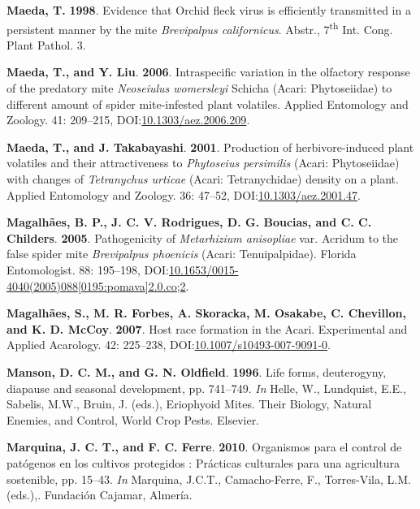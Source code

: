 \documentclass[12pt,final,CPage]{ufthesis}
\newlength{\cslhangindent}
\newenvironment{CSLReferences}[2] %
{%
	\setlength{\parindent}{0pt}
	\ifodd #1 \everypar{\setlength{\hangindent}{\cslhangindent}}\ignorespaces\fi
	\ifnum #2 > 0
	\setlength{\parskip}{#2\baselineskip}
	\fi
}%
{}
\begin{document}
{\begin{CSLReferences}{1}{0}
  \leavevmode{}%
  \textbf{Maeda, T.} \textbf{1998}. Evidence that {Orchid fleck virus} is efficiently transmitted in a persistent manner by the mite {\emph{Brevipalpus californicus}}. Abstr., 7\textsuperscript{th} Int. Cong. Plant Pathol. 3.

  \leavevmode{}%
  \textbf{Maeda, T., and Y. Liu}. \textbf{2006}. Intraspecific variation in the olfactory response of the predatory mite {\emph{Neoseiulus womersleyi}} {Schicha} {({Acari}: {Phytoseiidae})} to different amount of spider mite-infested plant volatiles. Applied Entomology and Zoology. 41: 209--215, DOI:\href{https://doi.org/10.1303/aez.2006.209}{10.1303/aez.2006.209}.

  \leavevmode{}%
  \textbf{Maeda, T., and J. Takabayashi}. \textbf{2001}. Production of herbivore-induced plant volatiles and their attractiveness to {\emph{Phytoseius persimilis}} {({Acari}: {Phytoseiidae})} with changes of {\emph{Tetranychus urticae}} {({Acari}: Tetranychidae)} density on a plant. Applied Entomology and Zoology. 36: 47--52, DOI:\href{https://doi.org/10.1303/aez.2001.47}{10.1303/aez.2001.47}.

  \leavevmode{}%
  \textbf{Magalhães, B. P., J. C. V. Rodrigues, D. G. Boucias, and C. C. Childers}. \textbf{2005}. Pathogenicity of {\emph{Metarhizium anisopliae}} var. Acridum to the false spider mite {\emph{Brevipalpus phoenicis}} ({Acari}: {Tenuipalpidae}). Florida Entomologist. 88: 195--198, DOI:\href{https://doi.org/10.1653/0015-4040(2005)088\%5B0195:pomava\%5D2.0.co;2}{10.1653/0015-4040(2005)088{[}0195:pomava{]}2.0.co;2}.

  \leavevmode{}%
  \textbf{Magalhães, S., M. R. Forbes, A. Skoracka, M. Osakabe, C. Chevillon, and K. D. McCoy}. \textbf{2007}. Host race formation in the {Acari}. Experimental and Applied Acarology. 42: 225--238, DOI:\href{https://doi.org/10.1007/s10493-007-9091-0}{10.1007/s10493-007-9091-0}.

  \leavevmode{}%
  \textbf{Manson, D. C. M., and G. N. Oldfield}. \textbf{1996}. Life forms, deuterogyny, diapause and seasonal development, pp. 741--749. \emph{In} Helle, W., Lundquist, E.E., Sabelis, M.W., Bruin, J. (eds.), Eriophyoid Mites. Their Biology, Natural Enemies, and Control, World Crop Pests. Elsevier.

  \leavevmode{}%
  \textbf{Marquina, J. C. T., and F. C. Ferre}. \textbf{2010}. Organismos para el control de pat{ó}genos en los cultivos protegidos : Pr{á}cticas culturales para una agricultura sostenible, pp. 15--43. \emph{In} Marquina, J.C.T., Camacho-Ferre, F., Torres-Vila, L.M. (eds.),. Fundaci{ó}n Cajamar, Almer{í}a.


\end{CSLReferences}}
\end{document}

